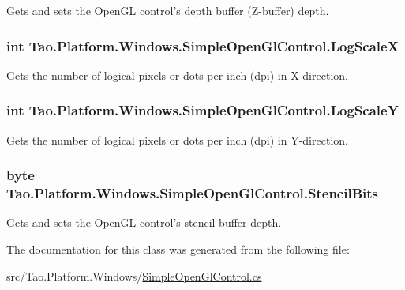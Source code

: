 Gets and sets the OpenGL control's depth buffer (Z-\/buffer) depth. 

\hypertarget{class_tao_1_1_platform_1_1_windows_1_1_simple_open_gl_control_ab14fda5344aa34eca23541070aa7f85a}{
\subsubsection[{LogScaleX}]{\setlength{\rightskip}{0pt plus 5cm}int Tao.Platform.Windows.SimpleOpenGlControl.LogScaleX}}
\label{class_tao_1_1_platform_1_1_windows_1_1_simple_open_gl_control_ab14fda5344aa34eca23541070aa7f85a}


Gets the number of logical pixels or dots per inch (dpi) in X-\/direction. 

\hypertarget{class_tao_1_1_platform_1_1_windows_1_1_simple_open_gl_control_a505290cb6af53a7ca7829627ba5177e2}{
\subsubsection[{LogScaleY}]{\setlength{\rightskip}{0pt plus 5cm}int Tao.Platform.Windows.SimpleOpenGlControl.LogScaleY}}
\label{class_tao_1_1_platform_1_1_windows_1_1_simple_open_gl_control_a505290cb6af53a7ca7829627ba5177e2}


Gets the number of logical pixels or dots per inch (dpi) in Y-\/direction. 

\hypertarget{class_tao_1_1_platform_1_1_windows_1_1_simple_open_gl_control_ab32f982b8369151f1d22cfaae715cb85}{
\subsubsection[{StencilBits}]{\setlength{\rightskip}{0pt plus 5cm}byte Tao.Platform.Windows.SimpleOpenGlControl.StencilBits}}
\label{class_tao_1_1_platform_1_1_windows_1_1_simple_open_gl_control_ab32f982b8369151f1d22cfaae715cb85}


Gets and sets the OpenGL control's stencil buffer depth. 



The documentation for this class was generated from the following file:\begin{DoxyCompactItemize}
\item 
src/Tao.Platform.Windows/\hyperlink{_simple_open_gl_control_8cs}{SimpleOpenGlControl.cs}\end{DoxyCompactItemize}
